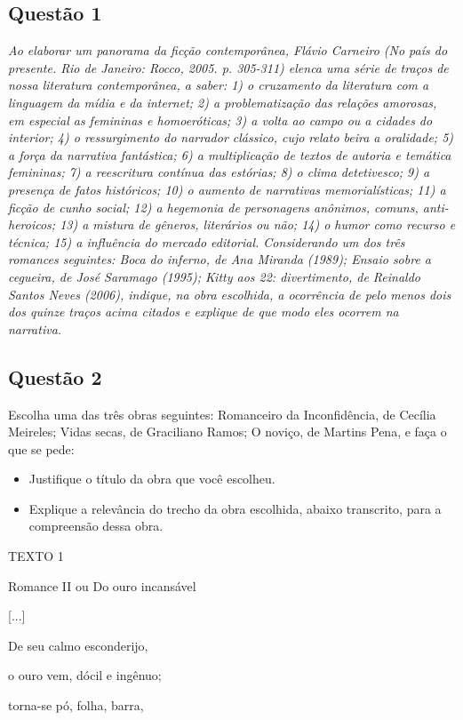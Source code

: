 \subsection{Questão 1}
\textit{Ao elaborar um panorama da ficção contemporânea, Flávio Carneiro (No país do presente. Rio de Janeiro: Rocco, 2005. p. 305-311) elenca uma série de
traços de nossa literatura contemporânea, a saber: 1) o cruzamento da literatura com a linguagem da mídia e da internet; 2) a problematização das relações amorosas, em especial as femininas e homoeróticas; 3) a volta ao campo ou a cidades do interior; 4) o ressurgimento do narrador clássico, cujo relato beira
a oralidade; 5) a força da narrativa fantástica; 6) a multiplicação de textos de autoria e temática femininas; 7) a reescritura contínua das estórias; 8) o clima detetivesco; 9) a presença de fatos históricos; 10) o aumento de narrativas memorialísticas; 11) a ficção de cunho social; 12) a hegemonia de personagens
anônimos, comuns, anti-heroicos; 13) a mistura de gêneros, literários ou não; 14) o humor como recurso e técnica; 15) a influência do mercado editorial. Considerando um dos três romances seguintes: Boca do inferno, de Ana Miranda (1989); Ensaio sobre a cegueira, de José Saramago (1995); Kitty aos 22: divertimento, de Reinaldo Santos Neves (2006), indique, na obra escolhida, a ocorrência de pelo menos dois dos quinze traços acima citados e explique de
que modo eles ocorrem na narrativa.
}

\subsection{Questão 2}
Escolha uma das três obras seguintes: Romanceiro da Inconfidência, de Cecília Meireles; Vidas secas, de Graciliano Ramos; O noviço, de Martins Pena, e faça o que se pede: 

\begin{itemize}
\item Justifique o título da obra que você escolheu.
\item Explique a relevância do trecho da obra escolhida, abaixo transcrito, para a compreensão dessa obra.
\end{itemize}

TEXTO 1
 
Romance II ou Do ouro incansável

[...]

De seu calmo esconderijo,

o ouro vem, dócil e ingênuo;

torna-se pó, folha, barra,


